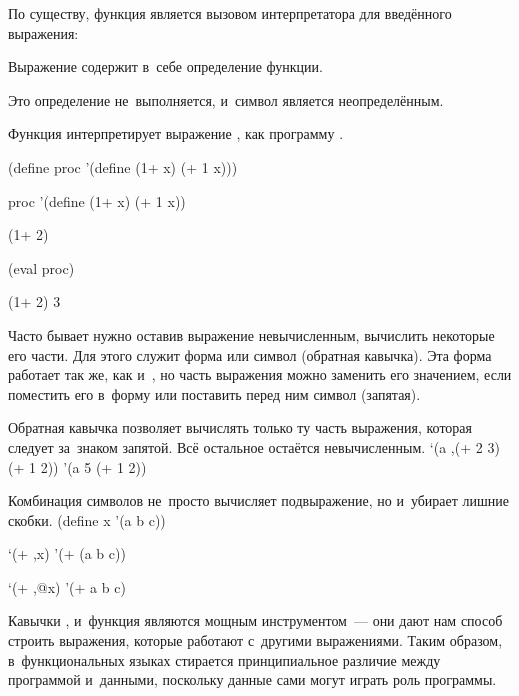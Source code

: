 По существу, функция  является вызовом интерпретатора \Scheme для введённого выражения:

\begin{example}{Выражение  содержит в~себе определение функции.

Это определение не~выполняется,  и~символ  является неопределённым.

Функция  интерпретирует  выражение , как программу \Scheme.}
\begin{ExampleCode}
(define proc
  '(define (1+ x)
       (+ 1 x)))
\end{ExampleCode}

\REPL
  {proc}
  {'(define (1+ x) (+ 1 x))}

\REPLin
  {(1+ 2)}


\REPLin
  {(eval proc)}

\REPL
  {(1+ 2)}
  {3}
\end{example}

Часто бывает нужно оставив выражение невычисленным, вычислить некоторые его части. Для этого служит форма  или символ  (обратная кавычка). Эта форма работает так же, как и~, но часть выражения можно заменить его значением, если поместить его в~форму  или поставить перед ним символ \s{,} (запятая).

\begin{example}{Обратная кавычка позволяет вычислять только ту часть выражения, которая следует за~знаком запятой. Всё остальное остаётся невычисленным.}
\REPL
  {`(a ,(+ 2 3) (+ 1 2))}
  {'(a 5 (+ 1 2))}
\end{example}

\begin{example}{Комбинация символов  не~просто вычисляет подвыражение, но и~убирает лишние скобки.}
\REPLin
  {(define x '(a b c))}

\REPL
  {`(+ ,x)}
  {'(+ (a b c))}

\REPL
  {`(+ ,@x)}
  {'(+ a b c)}
\end{example}

Кавычки ,  и~функция  являются мощным инструментом~--- они дают нам способ строить выражения, которые работают с~другими выражениями. Таким образом, в~функциональных языках стирается принципиальное различие между программой и~данными, поскольку данные сами могут играть роль программы.

